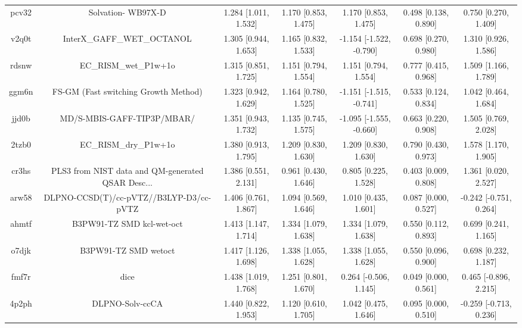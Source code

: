 \documentclass{article}
\begin{document}
\begin{center}
\begin{longtable}{|ccccccc|}
 pcv32 &                                 Solvation- WB97X-D &  1.284 [1.011, 1.532] &  1.170 [0.853, 1.475] &     1.170 [0.853, 1.475] &  0.498 [0.138, 0.890] &    0.750 [0.270, 1.409] \\
 v2q0t &                         InterX\_GAFF\_WET\_OCTANOL &  1.305 [0.944, 1.653] &  1.165 [0.832, 1.533] &  -1.154 [-1.522, -0.790] &  0.698 [0.270, 0.980] &    1.310 [0.926, 1.586] \\
 rdsnw &                              EC\_RISM\_wet\_P1w+1o &  1.315 [0.851, 1.725] &  1.151 [0.794, 1.554] &     1.151 [0.794, 1.554] &  0.777 [0.415, 0.968] &    1.509 [1.166, 1.789] \\
 ggm6n &               FS-GM (Fast switching Growth Method) &  1.323 [0.942, 1.629] &  1.164 [0.780, 1.525] &  -1.151 [-1.515, -0.741] &  0.533 [0.124, 0.834] &    1.042 [0.464, 1.684] \\
 jjd0b &                         MD/S-MBIS-GAFF-TIP3P/MBAR/ &  1.351 [0.943, 1.732] &  1.135 [0.745, 1.575] &  -1.095 [-1.555, -0.660] &  0.663 [0.220, 0.908] &    1.505 [0.769, 2.028] \\
 2tzb0 &                              EC\_RISM\_dry\_P1w+1o &  1.380 [0.913, 1.795] &  1.209 [0.830, 1.630] &     1.209 [0.830, 1.630] &  0.790 [0.430, 0.973] &    1.578 [1.170, 1.905] \\
 cr3hs &  PLS3 from NIST data and QM-generated QSAR Desc... &  1.386 [0.551, 2.131] &  0.961 [0.430, 1.646] &     0.805 [0.225, 1.528] &  0.403 [0.009, 0.808] &    1.361 [0.020, 2.527] \\
 arw58 &            DLPNO-CCSD(T)/cc-pVTZ//B3LYP-D3/cc-pVTZ &  1.406 [0.761, 1.867] &  1.094 [0.569, 1.646] &     1.010 [0.435, 1.601] &  0.087 [0.000, 0.527] &  -0.242 [-0.751, 0.264] \\
 ahmtf &                          B3PW91-TZ SMD kcl-wet-oct &  1.413 [1.147, 1.714] &  1.334 [1.079, 1.638] &     1.334 [1.079, 1.638] &  0.550 [0.112, 0.893] &    0.699 [0.241, 1.165] \\
 o7djk &                               B3PW91-TZ SMD wetoct &  1.417 [1.126, 1.698] &  1.338 [1.055, 1.628] &     1.338 [1.055, 1.628] &  0.550 [0.096, 0.900] &    0.698 [0.232, 1.187] \\
 fmf7r &                                               dice &  1.438 [1.019, 1.768] &  1.251 [0.801, 1.670] &    0.264 [-0.506, 1.145] &  0.049 [0.000, 0.561] &   0.465 [-0.896, 2.215] \\
 4p2ph &                                    DLPNO-Solv-ccCA &  1.440 [0.822, 1.953] &  1.120 [0.610, 1.705] &     1.042 [0.475, 1.646] &  0.095 [0.000, 0.510] &  -0.259 [-0.713, 0.236] \\

\end{longtable}
\end{center}
\end{document}
